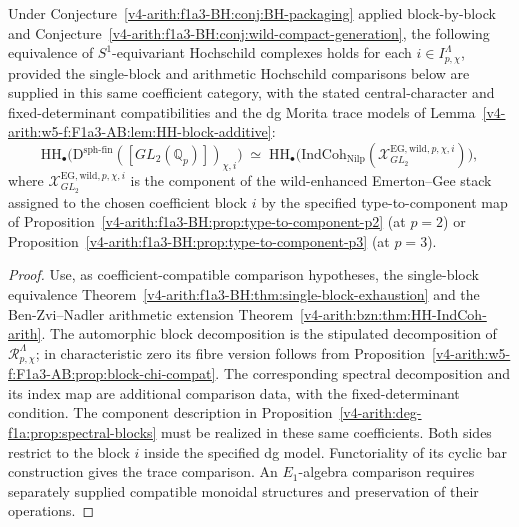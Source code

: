 \begin{theorem}
\label{v4-arith:w5-f:F1a3-AB:thm:block-wise-comparison}
\ClaimStatusProvedHereConditional Under
Conjecture~\ref{v4-arith:f1a3-BH:conj:BH-packaging} applied block-by-block and
Conjecture~\ref{v4-arith:f1a3-BH:conj:wild-compact-generation}, the following
equivalence of $S^1$-equivariant Hochschild complexes holds for each
$i\in I_{p,\chi}^{\Lambda}$, provided the single-block and arithmetic
Hochschild comparisons below are supplied in this same coefficient
category, with the stated central-character and fixed-determinant
compatibilities and the dg Morita trace models of
Lemma~\ref{v4-arith:w5-f:F1a3-AB:lem:HH-block-additive}:
\begin{equation}
\label{v4-arith:w5-f:F1a3-AB:eq:block-wise-comparison}
\mathrm{HH}_{\bullet}\bigl(\mathrm{D}^{\mathrm{sph\text{-}fin}}([GL_{2}(\mathbb{Q}_{p})])_{\chi,i}\bigr)
\;\simeq\;
\mathrm{HH}_{\bullet}\bigl(\mathrm{IndCoh}_{\mathrm{Nilp}}(\mathcal{X}^{\mathrm{EG,wild},p,\chi,i}_{GL_{2}})\bigr),
\end{equation}
where \(\mathcal{X}^{\mathrm{EG,wild},p,\chi,i}_{GL_{2}}\)
is the component of the wild-enhanced Emerton--Gee stack
assigned to the chosen coefficient block $i$ by the specified
type-to-component map of
Proposition~\ref{v4-arith:f1a3-BH:prop:type-to-component-p2} (at \(p=2\)) or
Proposition~\ref{v4-arith:f1a3-BH:prop:type-to-component-p3} (at \(p=3\)).
\end{theorem}

\begin{proof}
Use, as coefficient-compatible comparison hypotheses, the single-block equivalence
Theorem~\ref{v4-arith:f1a3-BH:thm:single-block-exhaustion} and the
Ben-Zvi--Nadler arithmetic extension
Theorem~\ref{v4-arith:bzn:thm:HH-IndCoh-arith}. The automorphic block decomposition is the stipulated decomposition
of $\mathcal R_{p,\chi}^{\Lambda}$; in characteristic zero its fibre
version follows from Proposition~\ref{v4-arith:w5-f:F1a3-AB:prop:block-chi-compat}.
The corresponding spectral decomposition and its index map are
additional comparison data, with the fixed-determinant condition.
The component description in
Proposition~\ref{v4-arith:deg-f1a:prop:spectral-blocks} must be realized in these
same coefficients. Both sides restrict
to the block \(i\) inside the specified dg model. Functoriality of
its cyclic bar construction gives the trace comparison. An
\(E_1\)-algebra comparison requires separately supplied compatible
monoidal structures and preservation of their operations.
\end{proof}

